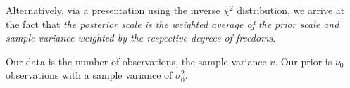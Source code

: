 \documentclass[a4paper]{article}
\begin{document}
Alternatively, via a presentation using the inverse $\chi^2$ distribution, we arrive at the fact that \emph{the posterior scale is the weighted average of the prior scale and sample variance weighted by the respective degrees of freedoms}.

Our data is the number of observations, the sample variance $v$.
Our prior is $\nu _0$ observations with a sample variance of $\sigma _0 ^2$.
\end{document}
